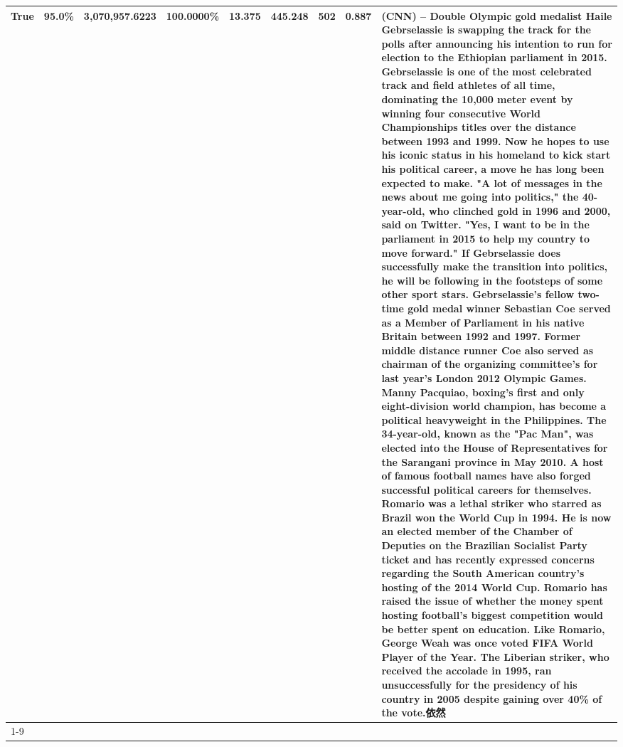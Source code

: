 \begin{table}[H]
{\begin{tabular}{lllrlllll}
True & 95.0\% & 3,070,957.6223 & \bfseries \color{red} 100.0000\% & 13.375 & 445.248 & 502 & 0.887 & (CNN) -- Double Olympic gold medalist Haile Gebrselassie is swapping the track for the polls after announcing his intention to run for election to the Ethiopian parliament in 2015. Gebrselassie is one of the most celebrated track and field athletes of all time, dominating the 10,000 meter event by winning four consecutive World Championships titles over the distance between 1993 and 1999. Now he hopes to use his iconic status in his homeland to kick start his political career, a move he has long been expected to make. "A lot of messages in the news about me going into politics," the 40-year-old, who clinched gold in 1996 and 2000, said on Twitter. "Yes, I want to be in the parliament in 2015 to help my country to move forward." If Gebrselassie does successfully make the transition into politics, he will be following in the footsteps of some other sport stars. Gebrselassie's fellow two-time gold medal winner Sebastian Coe served as a Member of Parliament in his native Britain between 1992 and 1997. Former middle distance runner Coe also served as chairman of the organizing committee's for last year's London 2012 Olympic Games. Manny Pacquiao, boxing's first and only eight-division world champion, has become a political heavyweight in the Philippines. The 34-year-old, known as the "Pac Man", was elected into the House of Representatives for the Sarangani province in May 2010. A host of famous football names have also forged successful political careers for themselves. Romario was a lethal striker who starred as Brazil won the World Cup in 1994. He is now an elected member of the Chamber of Deputies on the Brazilian Socialist Party ticket and has recently expressed concerns regarding the South American country's hosting of the 2014 World Cup. Romario has raised the issue of whether the money spent hosting football's biggest competition would be better spent on education. Like Romario, George Weah was once voted FIFA World Player of the Year. The Liberian striker, who received the accolade in 1995, ran unsuccessfully for the presidency of his country in 2005 despite gaining over 40\% of the vote.依然 \\
\cline{1-9}

\end{tabular}}
\end{table}
